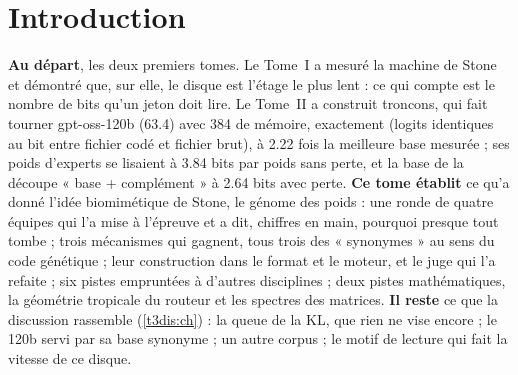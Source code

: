 
\chapter{Introduction}\label{t3int:ch}

\begin{origine}
\textbf{Au départ}, les deux premiers tomes. Le Tome~I a mesuré la machine de Stone et démontré que, sur elle, le disque est l'étage le plus lent : ce qui compte est le nombre de bits qu'un jeton doit lire. Le Tome~II a construit troncons, qui fait tourner gpt-oss-120b (\SI{63.4}{\Go}) avec \SI{384}{\Mo} de mémoire, exactement (logits identiques au bit entre fichier codé et fichier brut), à \num{2.22} fois la meilleure base mesurée ; ses poids d'experts se lisaient à \num{3.84} bits par poids sans perte, et la base de la découpe « base + complément » à \num{2.64} bits avec perte.
\textbf{Ce tome établit} ce qu'a donné l'idée biomimétique de Stone, le génome des poids : une ronde de quatre équipes qui l'a mise à l'épreuve et a dit, chiffres en main, pourquoi presque tout tombe ; trois mécanismes qui gagnent, tous trois des « synonymes » au sens du code génétique ; leur construction dans le format et le moteur, et le juge qui l'a refaite ; six pistes empruntées à d'autres disciplines ; deux pistes mathématiques, la géométrie tropicale du routeur et les spectres des matrices.
\textbf{Il reste} ce que la discussion rassemble (\cref{t3dis:ch}) : la queue de la KL, que rien ne vise encore ; le 120b servi par sa base synonyme ; un autre corpus ; le motif de lecture qui fait la vitesse de ce disque.
\end{origine}

